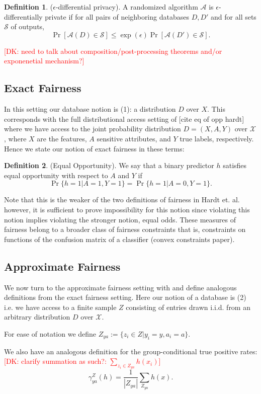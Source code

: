 \documentclass[format = sigconf]{acmart}
\newcommand{\dk}[1]{\textcolor{red}{[DK: #1]}}
\newcommand{\A}{\mathcal{A}}
\newcommand{\X}{\mathcal{X}}
\renewcommand{\S}{\mathcal{S}}
\newcommand{\1}{\mathbbm{1}}
\newcommand{\eps}{\epsilon}
\newcommand{\zya}{Z_{ya}}
\theoremstyle{definition}
\newtheorem{defn}{Definition}[section]
\begin{document}
\begin{defn}
($\eps$-differential privacy). A randomized algorithm $\A$ is $\eps$-differentially private if for all pairs of neighboring databases $D,D'$ and for all sets $\S$ of outputs,
	$$\Pr[\A(D)\in \S] \leq \exp(\eps)\Pr[\A(D')\in \S].$$
\end{defn}
\dk{need to talk about composition/post-processing theorems and/or exponenetial mechanism?}
\subsection{Exact Fairness}

In this setting our database notion is (1): a distribution $D$ over $X$. This corresponds with the full distributional access setting of [cite eq of opp hardt] where we have access to the joint probability distribution $D = (X, A, Y)$ over $\X$, where $X$ are the features, $A$ sensitive attributes, and $Y$ true labels, respectively. Hence we state our notion of exact fairness in these terms:

\begin{defn}
	 (Equal Opportunity). We say that a binary predictor $h$ satisfies equal opportunity with respect to $A$ and $Y$ if
	$$\Pr\{h = 1 | A =1, Y=1\} = \Pr\{h = 1 | A=0, Y=1\}.$$
\end{defn}

Note that this is the weaker of the two definitions of fairness in Hardt et. al. however, it is sufficient to prove impossibility for this notion since violating this notion implies violating the stronger notion, equal odds. These measures of fairness belong to a broader class of fairness constraints that is, constraints on functions of the confusion matrix of a classifier (convex constraints paper).

\subsection{Approximate Fairness}
We now turn to the approximate fairness setting with and define analogous definitions from the exact fairness setting. Here our notion of a database is (2) i.e. we have access to a finite sample $Z$ consisting of entries drawn i.i.d. from an arbitrary distribution $D$ over $\X$.

For ease of notation we define $\zya := \{z_i \in Z | y_i = y, a_i = a \}$.

We also have an analogous definition for the group-conditional true positive rates: \dk {clarify summation as such?: $\sum_{z_i \in \zya} h(x_i)$}
$$\gamma_{ya}^Z(h) = \frac{1}{|\zya|} \sum_{\zya} h(x).$$
\end{document}
